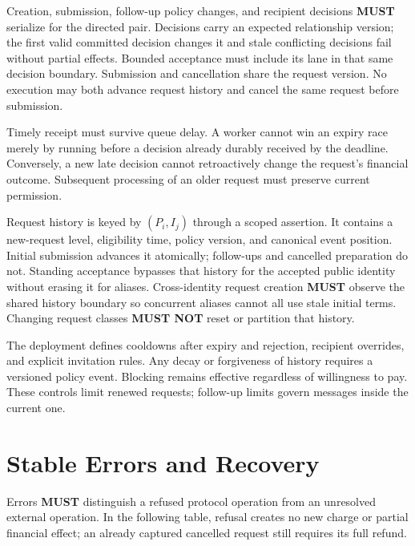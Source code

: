 \documentclass[11pt]{article}
\newcommand{\MUST}{\textbf{MUST}}
\newcommand{\MUSTNOT}{\textbf{MUST NOT}}
\begin{document}
Creation, submission, follow-up policy changes, and recipient decisions \MUST{}
serialize for the directed pair. Decisions carry an expected relationship
version; the first valid committed decision changes it and stale conflicting
decisions fail without partial effects. Bounded acceptance must include its lane
in that same decision boundary. Submission and cancellation share the
request version. No execution may both advance request history and cancel the
same request before submission.

Timely receipt must survive queue delay. A worker cannot win an expiry race merely
by running before a decision already durably received by the deadline. Conversely,
a new late decision cannot retroactively change the request's financial outcome.
Subsequent processing of an older request must preserve current permission.

Request history is keyed by $(P_i,I_j)$ through a scoped assertion. It contains a
new-request level, eligibility time, policy version, and canonical event position.
Initial submission advances it atomically; follow-ups and cancelled preparation do
not. Standing acceptance bypasses that history for the accepted public identity without
erasing it for aliases. Cross-identity request creation \MUST{} observe the shared
history boundary so concurrent aliases cannot all use stale initial terms.
Changing request classes \MUSTNOT{} reset or partition that history.

The deployment defines cooldowns after expiry and rejection, recipient overrides,
and explicit invitation rules. Any decay or forgiveness of history requires a
versioned policy event. Blocking remains effective regardless of willingness to
pay. These controls limit renewed requests; follow-up limits govern messages
inside the current one.

\section{Stable Errors and Recovery}

Errors \MUST{} distinguish a refused protocol operation from an unresolved
external operation. In the following table, refusal creates no new charge or
partial financial effect; an already captured cancelled request still requires
its full refund.
\end{document}

